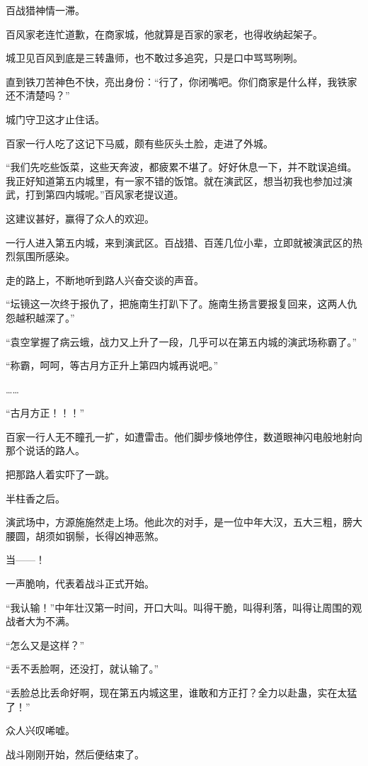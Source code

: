 \begin{this_body}
百战猎神情一滞。

百风家老连忙道歉，在商家城，他就算是百家的家老，也得收纳起架子。

城卫见百风到底是三转蛊师，也不敢过多追究，只是口中骂骂咧咧。

直到铁刀苦神色不快，亮出身份：“行了，你闭嘴吧。你们商家是什么样，我铁家还不清楚吗？”

城门守卫这才止住话。

百家一行人吃了这记下马威，颇有些灰头土脸，走进了外城。

“我们先吃些饭菜，这些天奔波，都疲累不堪了。好好休息一下，并不耽误追缉。我正好知道第五内城里，有一家不错的饭馆。就在演武区，想当初我也参加过演武，打到第四内城呢。”百风家老提议道。

这建议甚好，赢得了众人的欢迎。

一行人进入第五内城，来到演武区。百战猎、百莲几位小辈，立即就被演武区的热烈氛围所感染。

走的路上，不断地听到路人兴奋交谈的声音。

“坛镜这一次终于报仇了，把施南生打趴下了。施南生扬言要报复回来，这两人仇怨越积越深了。”

“袁空掌握了病云蛾，战力又上升了一段，几乎可以在第五内城的演武场称霸了。”

“称霸，呵呵，等古月方正升上第四内城再说吧。”

……

“古月方正！！！”

百家一行人无不瞳孔一扩，如遭雷击。他们脚步倏地停住，数道眼神闪电般地射向那个说话的路人。

把那路人着实吓了一跳。

半柱香之后。

演武场中，方源施施然走上场。他此次的对手，是一位中年大汉，五大三粗，膀大腰圆，胡须如钢鬃，长得凶神恶煞。

当——！

一声脆响，代表着战斗正式开始。

“我认输！”中年壮汉第一时间，开口大叫。叫得干脆，叫得利落，叫得让周围的观战者大为不满。

“怎么又是这样？”

“丢不丢脸啊，还没打，就认输了。”

“丢脸总比丢命好啊，现在第五内城这里，谁敢和方正打？全力以赴蛊，实在太猛了！”

众人兴叹唏嘘。

战斗刚刚开始，然后便结束了。


\end{this_body}
